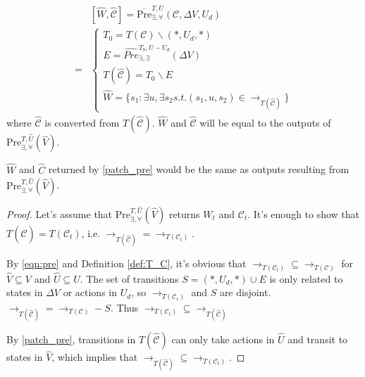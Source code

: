 \begin{align}
&[\widehat{W},\widehat{\mathcal{C}}]=\overline{\text{Pre}}_{\exists,\forall}^{T, U}(\mathcal{C},\Delta V,U_d)\\
=&\begin{cases} 
T_{0} = T(\mathcal{C})\backslash (*,U_d,*)\\
E =  \widehat{Pre}^{T_0,U-U_d}_{\exists,\exists}(\Delta V)\\
T(\widehat{\mathcal{C}}) = T_{0}\backslash E\\
\widehat{W} = \{s_1: \exists u, \exists s_2 s.t. (s_1,u, s_2)\in \rightarrow_{T(\widehat{\mathcal{C}})} \}
\end{cases}\label{patch_pre}
\end{align}
where $ \widehat{\mathcal{C}} $ is converted from $ T(\widehat{\mathcal{C}}) $. $ \widehat{W} $ and $ \widehat{\mathcal{C}} $ will be equal to the outputs of $ \text{Pre}_{\exists,\forall}^{T,\widehat{U}}(\widehat{V}) $.

\begin{theorem}
	$ \widehat{W} $ and $ \widehat{C} $ returned by \ref{patch_pre} would be the same as outputs resulting from $ \text{Pre}_{\exists,\forall}^{T,\widehat{U}}(\widehat{V})$.	
\end{theorem}

\begin{proof}
	Let's assume that $ \text{Pre}_{\exists,\forall}^{T,\widehat{U}}(\widehat{V}) $ returns $ W_t $ and $ \mathcal{C}_t $. It's enough to show that $ T(\widehat{\mathcal{C}})= T(\mathcal{C}_t)$, i.e. $ \rightarrow_{T(\widehat{\mathcal{C}})} = \rightarrow_{T(\mathcal{C}_t)} $. 
	
	By \eqref{eqn:pre} and Definition \ref{def:T_C}, it's obvious that $ \rightarrow_{T(\mathcal{C}_t)} \subseteq \rightarrow_{T(\mathcal{C})}$ for $ \widehat{V}\subseteq V $ and $ \widehat{U}\subseteq U $. The set of transitions $ S = (*,U_d,*)\cup E $ is only related to states in $ \Delta V $ or actions in $ U_d $, so $\rightarrow_{T(\mathcal{C}_t)}$ and $ S $ are disjoint. $ \rightarrow_{T(\widehat{\mathcal{C}})}= \rightarrow_{T(\mathcal{C})}-S$. Thus $ \rightarrow_{T(\mathcal{C}_t)}\subseteq \rightarrow_{T(\widehat{\mathcal{C}})}$ 
	
	By \eqref{patch_pre}, transitions in $ T(\widehat{\mathcal{C}}) $ can only take actions in $ \widehat{U} $ and transit to states in $ \widehat{V} $, which implies that $ \rightarrow_{T(\widehat{\mathcal{C}})}\subseteq \rightarrow_{T(\mathcal{C}_t)} $.  
\end{proof}


